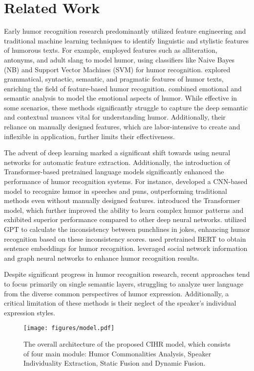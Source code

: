 \section{Related Work}
Early humor recognition research predominantly utilized feature engineering and traditional machine learning techniques to identify linguistic and stylistic features of humorous texts\cite{yang2015humor, liu2018modeling}.
For example, \citet{mihalcea2005making} employed features such as alliteration, antonyms, and adult slang to model humor, using classifiers like Naive Bayes (NB) and Support Vector Machines (SVM) \citep{cortes1995support} for humor recognition. \citet{raz2012automatic} explored grammatical, syntactic, semantic, and pragmatic features of humor texts, enriching the field of feature-based humor recognition. \citet{liu2018modeling} combined emotional and semantic analysis to model the emotional aspects of humor. 
While effective in some scenarios, these methods significantly struggle to capture the deep semantic and contextual nuances vital for understanding humor. 
Additionally, their reliance on manually designed features, which are labor-intensive to create and inflexible in application, further limits their effectiveness.

The advent of deep learning marked a significant shift towards using neural networks for automatic feature extraction. 
Additionally, the introduction of Transformer-based pretrained language models significantly enhanced the performance of humor recognition systems. 
For instance, \citet{chen2017predicting} developed a CNN-based model to recognize humor in speeches and puns, outperforming traditional methods even without manually designed features. 
\citet{weller2019humor} introduced the Transformer model, which further improved the ability to learn complex humor patterns and exhibited superior performance compared to other deep neural networks. 
\citet{xie2021uncertainty} utilized GPT \citep{radford2018improving} to calculate the inconsistency between punchlines in jokes, enhancing humor recognition based on these inconsistency scores. 
\citep{annamoradnejad2024colbert, yang2021choral} used pretrained BERT \citep{kenton2019bert} to obtain sentence embeddings for humor recognition. 
\citep{zeng2024leveraging} leveraged social network information and graph neural networks to enhance humor recognition results.

Despite significant progress in humor recognition research, recent approaches tend to focus primarily on single semantic layers, struggling to analyze user language from the diverse common perspectives of humor expression. Additionally, a critical limitation of these methods is their neglect of the speaker’s individual expression styles. 

\begin{figure*}[!ht]
\centering
    \texttt{[image: figures/model.pdf]}
\caption{The overall architecture of the proposed CIHR model, which consists of four main module: Humor Commonalities Analysis, Speaker Individuality Extraction, Static Fusion and Dynamic Fusion.}
\label{fig:model}
\end{figure*}